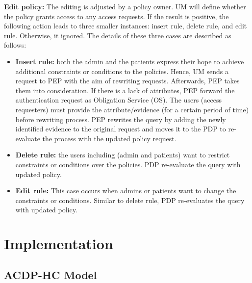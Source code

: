 \textbf{Edit policy:}
The editing is adjusted by a policy owner.
UM will define whether the policy grants access to any access requests.
If the result is positive, the following action leads to three smaller instances: insert rule, delete rule, and edit rule. 
Otherwise, it ignored. 
The details of these three cases are described as follows:
\begin{itemize}
  \item \textbf{Insert rule: }both the admin and the patients express their hope to achieve additional constraints or conditions to the policies. 
  Hence, UM sends a request to PEP with the aim of rewriting requests. 
  Afterwards, PEP takes them into consideration. 
  If there is a lack of attributes, PEP forward the authentication request as Obligation Service (OS). 
  The users (access requesters) must provide the attribute/evidence (for a certain period of time) before rewriting process. 
  PEP rewrites the query by adding the newly identified evidence to the original request and moves it to the PDP to re-evaluate the process with the updated policy request.
  \item \textbf{Delete rule: } the users including (admin and patients) want to restrict constraints or conditions over the policies. 
  PDP re-evaluate the query with updated policy.
  \item \textbf{Edit rule: }This case occurs when admins or patients want to change the constraints or conditions. 
  Similar to delete rule, PDP re-evaluates the query with updated policy.
\end{itemize}

\section{Implementation}\label{sec:Imp}

\subsection{ACDP-HC Model}\label{model}

